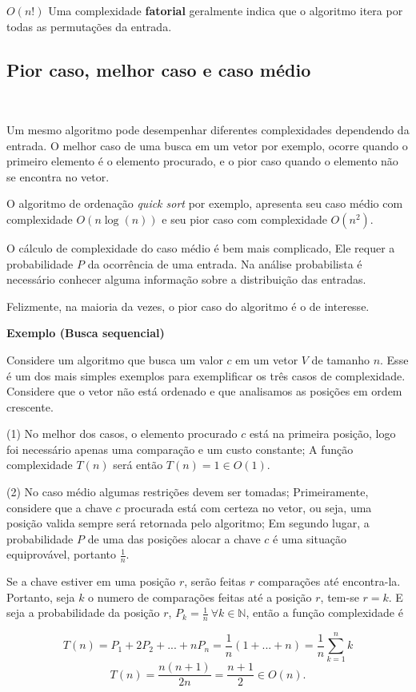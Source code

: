 $O(n!)$ Uma complexidade \textbf{fatorial} geralmente indica que o algoritmo itera por todas as permutações da entrada.

\subsection{Pior caso, melhor caso e caso médio}
\

Um mesmo algoritmo pode desempenhar diferentes complexidades dependendo da entrada. O melhor caso de uma busca em um vetor por exemplo, ocorre quando o primeiro elemento é o elemento procurado, e o pior caso quando o elemento não se encontra no vetor.

O algoritmo de ordenação \textit{quick sort} por exemplo, apresenta seu caso médio com complexidade $O(n\log(n))$ e seu pior caso com complexidade $O(n^2)$.

O cálculo de complexidade do caso médio é bem mais complicado, Ele requer a probabilidade $P$ da ocorrência de uma entrada. Na análise probabilista é necessário conhecer alguma informação sobre a distribuição das entradas.

Felizmente, na maioria da vezes, o pior caso do algoritmo é o de interesse.

\textbf{Exemplo (Busca sequencial)}

Considere um algoritmo que busca um valor $c$ em um vetor $V$ de tamanho $n$. Esse é um dos mais simples exemplos para exemplificar os três casos de complexidade. Considere que o vetor não está ordenado e que analisamos as posições em ordem crescente.

(1) No melhor dos casos, o elemento procurado $c$ está na primeira posição, logo foi necessário apenas uma comparação e um custo constante; A função complexidade $T(n)$ será então $T(n) = 1 \in O(1)$.

(2) No caso médio algumas restrições devem ser tomadas; Primeiramente, considere que a chave $c$ procurada está com certeza no vetor, ou seja, uma posição valida sempre será retornada pelo algoritmo; Em segundo lugar, a probabilidade $P$ de uma das posições alocar a chave $c$ é uma situação equiprovável, portanto $\frac{1}{n}$.

Se a chave estiver em uma posição $r$, serão feitas $r$ comparações até encontra-la. Portanto, seja $k$ o numero de comparações feitas até a posição $r$, tem-se $r=k$. E seja a probabilidade da posição $r$, $P_k = \frac{1}{n} \ \forall k \in \mathbb{N}$, então a função complexidade é 

\[T(n) = P_1 + 2P_2 + ... + nP_n = \frac{1}{n}(1+...+n) = \frac{1}{n}\sum_{k=1}^n k\]
\[T(n)=\frac{n(n+1)}{2n} = \frac{n+1}{2} \in O(n).\]

